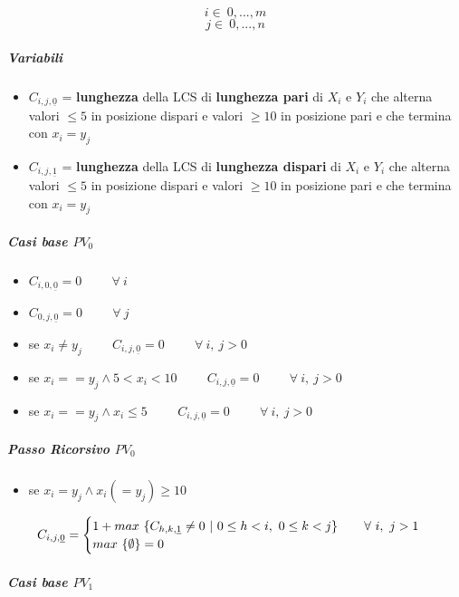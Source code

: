 \documentclass[12pt]{article}
\begin{document}
$$i\in \ {0,...,m}$$
$$j\in \ {0,...,n}$$
\subparagraph{Variabili}
\begin{itemize}
    \item $C_{i, j, \underline{0}}$ = \textbf{lunghezza} della LCS di \textbf{lunghezza pari} di $X_i$ e $Y_i$ che alterna valori $\leq 5$ in posizione dispari e valori $\geq 10$ in posizione pari e che termina con $x_i = y_j$
    \item $C_{i, j, \underline{1}}$ = \textbf{lunghezza} della LCS di \textbf{lunghezza dispari} di $X_i$ e $Y_i$ che alterna valori $\leq 5$ in posizione dispari e valori $\geq 10$ in posizione pari e che termina con $x_i = y_j$
\end{itemize}
\subparagraph{Casi base $PV_0$}
\begin{itemize}
    \item $C_{i,0,\underline{0}}=0 \hspace{1cm} \forall \ i$
    \item $C_{0,j,\underline{0}}=0 \hspace{1cm} \forall \ j$
    \item se $x_i \neq y_j \hspace{1cm} C_{i,j, \underline{0}}=0 \hspace{1cm} \forall \ i, \ j > 0$
    \item se $x_i == y_j \land 5<x_i<10 \hspace{1cm} C_{i,j,\underline{0}}=0 \hspace{1cm} \forall \ i, \ j > 0$
    \item se $x_i == y_j \land x_i \leq 5 \hspace{1cm} C_{i,j,\underline{0}}=0 \hspace{1cm} \forall \ i, \ j > 0$
\end{itemize}
\subparagraph{Passo Ricorsivo $PV_0$}
\begin{itemize}
    \item se $x_i=y_j \land x_i(=y_j)\geq 10$
\end{itemize}
\[
    C_{i, j, \underline{0}}=\begin{cases}
        1 + max \ \{C_{h, k, \underline{1}}\neq 0 \ | \ 0 \leq h<i, \ 0 \leq k<j\}$ \hspace{0.5cm} $\forall \ i, \ j>1 \\
        max \ \{\emptyset\} = 0
    \end{cases}
\]
\subparagraph{Casi base $PV_1$}
\end{document}
